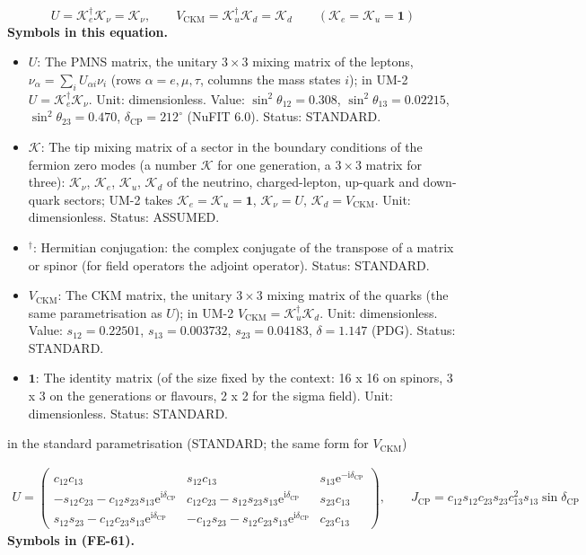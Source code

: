 \documentclass[
  10pt,
]{article}
\providecommand{\tightlist}{%
  \setlength{\itemsep}{0pt}\setlength{\parskip}{0pt}}
\begin{document}
\[ U = \mathcal{K}_e^\dagger\mathcal{K}_\nu = \mathcal{K}_\nu,\qquad V_{\mathrm{CKM}} = \mathcal{K}_u^\dagger\mathcal{K}_d = \mathcal{K}_d\qquad (\mathcal{K}_e = \mathcal{K}_u = \mathbf{1}) \]
\textbf{Symbols in this equation.}

\begin{itemize}
\tightlist
\item
  \(U\): The PMNS matrix, the unitary \(3 \times 3\) mixing matrix of
  the leptons, \(\nu_\alpha = \sum_iU_{\alpha i}\nu_i\) (rows
  \(\alpha = e, \mu, \tau\), columns the mass states \(i\)); in UM-2
  \(U = \mathcal{K}_e^\dagger\mathcal{K}_\nu\). Unit: dimensionless.
  Value: \(\sin^2\theta_{12} = 0.308\), \(\sin^2\theta_{13} = 0.02215\),
  \(\sin^2\theta_{23} = 0.470\), \(\delta_{\mathrm{CP}} = 212^\circ\)
  (NuFIT 6.0). Status: STANDARD.
\item
  \(\mathcal{K}\): The tip mixing matrix of a sector in the boundary
  conditions of the fermion zero modes (a number \(\mathcal{K}\) for one
  generation, a \(3 \times 3\) matrix for three): \(\mathcal{K}_\nu\),
  \(\mathcal{K}_e\), \(\mathcal{K}_u\), \(\mathcal{K}_d\) of the
  neutrino, charged-lepton, up-quark and down-quark sectors; UM-2 takes
  \(\mathcal{K}_e = \mathcal{K}_u = \mathbf{1}\),
  \(\mathcal{K}_\nu = U\), \(\mathcal{K}_d = V_{\mathrm{CKM}}\). Unit:
  dimensionless. Status: ASSUMED.
\item
  \({}^\dagger\): Hermitian conjugation: the complex conjugate of the
  transpose of a matrix or spinor (for field operators the adjoint
  operator). Status: STANDARD.
\item
  \(V_{\mathrm{CKM}}\): The CKM matrix, the unitary \(3 \times 3\)
  mixing matrix of the quarks (the same parametrisation as \(U\)); in
  UM-2 \(V_{\mathrm{CKM}} = \mathcal{K}_u^\dagger\mathcal{K}_d\). Unit:
  dimensionless. Value: \(s_{12} = 0.22501\), \(s_{13} = 0.003732\),
  \(s_{23} = 0.04183\), \(\delta = 1.147\) (PDG). Status: STANDARD.
\item
  \(\mathbf{1}\): The identity matrix (of the size fixed by the context:
  16 x 16 on spinors, 3 x 3 on the generations or flavours, 2 x 2 for
  the sigma field). Unit: dimensionless. Status: STANDARD.
\end{itemize}

in the standard parametrisation (STANDARD; the same form for
\(V_{\mathrm{CKM}}\))

\[
\begin{aligned}
U = \begin{pmatrix} c_{12}c_{13} & s_{12}c_{13} & s_{13}\mathrm{e}^{-\mathrm{i}\delta_{\mathrm{CP}}}\\
 -s_{12}c_{23} - c_{12}s_{23}s_{13}\mathrm{e}^{\mathrm{i}\delta_{\mathrm{CP}}} &
 c_{12}c_{23} - s_{12}s_{23}s_{13}\mathrm{e}^{\mathrm{i}\delta_{\mathrm{CP}}} & s_{23}c_{13}\\
 s_{12}s_{23} - c_{12}c_{23}s_{13}\mathrm{e}^{\mathrm{i}\delta_{\mathrm{CP}}} &
 -c_{12}s_{23} - s_{12}c_{23}s_{13}\mathrm{e}^{\mathrm{i}\delta_{\mathrm{CP}}} &
 c_{23}c_{13}\end{pmatrix},\qquad
J_{\mathrm{CP}} = c_{12}s_{12}c_{23}s_{23}c_{13}^2s_{13}\sin\delta_{\mathrm{CP}}
\end{aligned} \tag{FE-61}
\] \textbf{Symbols in (FE-61).}
\end{document}
